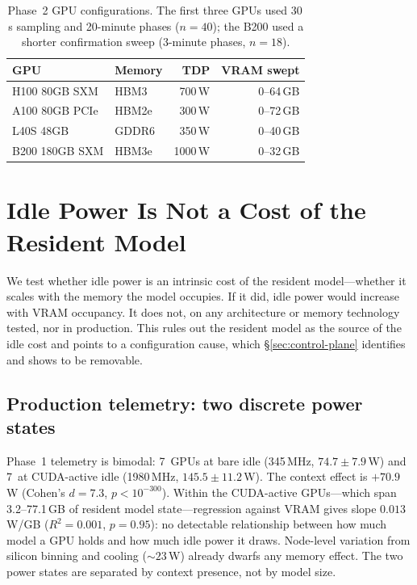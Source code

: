 \documentclass[conference]{IEEEtran}
\begin{document}
\begin{table}[t]
\caption{Phase~2 GPU configurations. The first three GPUs used 30\,s sampling and 20-minute phases ($n=40$); the B200 used a shorter confirmation sweep (3-minute phases, $n=18$).}
\label{tab:gpus}
\centering
\small
\begin{tabular}{llrr}
\toprule
\textbf{GPU} & \textbf{Memory} & \textbf{TDP} & \textbf{VRAM swept} \\
\midrule
H100 80GB SXM & HBM3 & 700\,W & 0--64\,GB \\
A100 80GB PCIe & HBM2e & 300\,W & 0--72\,GB \\
L40S 48GB & GDDR6 & 350\,W & 0--40\,GB \\
B200 180GB SXM & HBM3e & 1000\,W & 0--32\,GB \\
\bottomrule
\end{tabular}
\end{table}

\section{Idle Power Is Not a Cost of the Resident Model}
\label{sec:model-doesnt-matter}
We test whether idle power is an intrinsic cost of the resident model---whether it scales with the memory the model occupies. If it did, idle power would increase with VRAM occupancy. It does not, on any architecture or memory technology tested, nor in production. This rules out the resident model as the source of the idle cost and points to a configuration cause, which \S\ref{sec:control-plane} identifies and shows to be removable.

\subsection{Production telemetry: two discrete power states}
Phase~1 telemetry is bimodal: 7~GPUs at bare idle (345\,MHz, $74.7 \pm 7.9$\,W) and 7~at CUDA-active idle (1980\,MHz, $145.5 \pm 11.2$\,W). The context effect is $+70.9$\,W (Cohen's $d = 7.3$, $p < 10^{-300}$). Within the CUDA-active GPUs---which span 3.2--77.1\,GB of resident model state---regression against VRAM gives slope $0.013$\,W/GB ($R^2 = 0.001$, $p = 0.95$): no detectable relationship between how much model a GPU holds and how much idle power it draws. Node-level variation from silicon binning and cooling (${\sim}23$\,W) already dwarfs any memory effect. The two power states are separated by context presence, not by model size.
\end{document}
